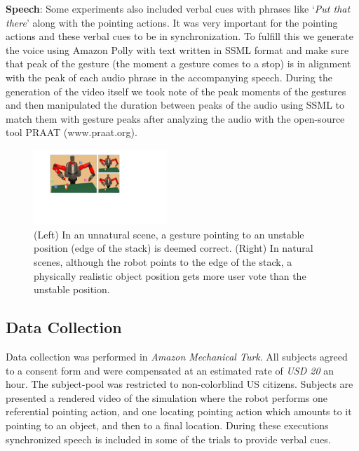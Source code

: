 

\noindent\textbf{Speech}: Some experiments also included verbal cues with phrases like `\textit{Put that there}' along with the pointing actions. It was very important for the pointing actions and these verbal cues to be in synchronization. To fulfill this we generate the voice using Amazon Polly with text written in SSML format and make sure that peak of the gesture (the moment a gesture comes to a stop) is in alignment with the peak of each audio phrase in the accompanying speech. During the generation of the video itself we took note of the peak moments of the gestures and then manipulated the duration between peaks of the audio using SSML to match them with gesture peaks after analyzing the audio with the open-source tool PRAAT (www.praat.org).



\begin{figure}[t]
    \centering
    \includegraphics[width=0.45\textwidth]{natural.pdf}
    \caption{(Left) In an unnatural scene, a gesture pointing to an unstable position (edge of the stack) is deemed correct. (Right) In natural scenes, although the robot points to the edge of the stack, a physically realistic object position gets more user vote than the unstable position.}
    \label{fig:natural}
\end{figure}

\subsection{Data Collection}

Data collection was performed in \textit{Amazon Mechanical Turk}. All subjects agreed to a consent form and were compensated at an estimated rate of \textit{USD 20} an hour. The subject-pool was restricted to non-colorblind US citizens. Subjects are presented a rendered video of the simulation where the robot performs one referential pointing action, and one locating pointing action which amounts to it pointing to an object, and then to a final location. During these executions synchronized speech is included in some of the trials to provide verbal cues.

